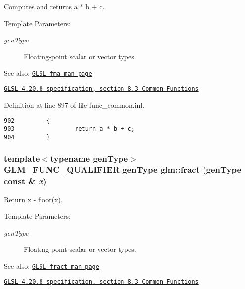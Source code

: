 Computes and returns a $\ast$ b + c.

\begin{Desc}
\item[Template Parameters:]
\begin{description}
\item[{\em genType}]Floating-point scalar or vector types.\end{description}
\end{Desc}
\begin{Desc}
\item[See also:]\href{http://www.opengl.org/sdk/docs/manglsl/xhtml/fma.xml}{\tt GLSL fma man page} 

\href{http://www.opengl.org/registry/doc/GLSLangSpec.4.20.8.pdf}{\tt GLSL 4.20.8 specification, section 8.3 Common Functions} \end{Desc}


Definition at line 897 of file func\_\-common.inl.

\begin{Code}\begin{verbatim}902         {
903                 return a * b + c;
904         }
\end{verbatim}
\end{Code}


\hypertarget{group__core__func__common_g7418318e0c1a82f21805628aabb0e24e}{
\subsubsection[fract]{\setlength{\rightskip}{0pt plus 5cm}template$<$typename genType$>$ GLM\_\-FUNC\_\-QUALIFIER genType glm::fract (genType const \& {\em x})}}
\label{group__core__func__common_g7418318e0c1a82f21805628aabb0e24e}


Return x - floor(x).

\begin{Desc}
\item[Template Parameters:]
\begin{description}
\item[{\em genType}]Floating-point scalar or vector types.\end{description}
\end{Desc}
\begin{Desc}
\item[See also:]\href{http://www.opengl.org/sdk/docs/manglsl/xhtml/fract.xml}{\tt GLSL fract man page} 

\href{http://www.opengl.org/registry/doc/GLSLangSpec.4.20.8.pdf}{\tt GLSL 4.20.8 specification, section 8.3 Common Functions} \end{Desc}


